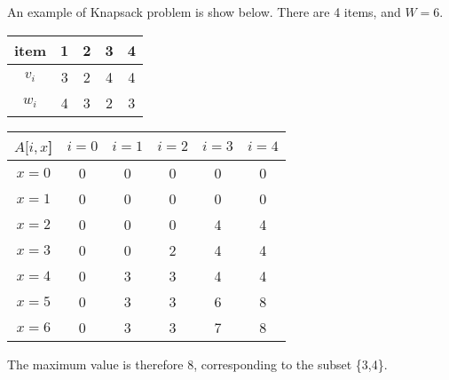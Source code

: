 An example of Knapsack problem is show below. There are 4 items, and $W = 6$. 
\begin{center}
\begin{tabular}{c|cccc}
item  & 1 & 2 & 3 & 4\\\hline
$v_i$ & 3 & 2 & 4 & 4\\
$w_i$ & 4 & 3 & 2 & 3\\
\end{tabular}
\begin{tabular}{c|ccccc}
$A[i,x$]& $i=0$ & $i=1$ & $i=2$ & $i=3$ & $i=4$\\\hline
$x=0$   &	0   & 0     & 0     & 0     & 0\\
$x=1$   &	0   & 0     & 0     & 0     & 0\\
$x=2$   &	0   & 0     & 0     & 4     & 4\\
$x=3$   &	0   & 0     & 2     & 4     & 4\\
$x=4$   &	0   & 3     & 3     & 4     & 4\\
$x=5$   &	0   & 3     & 3     & 6     & 8\\
$x=6$   &	0   & 3     & 3     & 7     & 8\\
\end{tabular}
\end{center}

The maximum value is therefore 8, corresponding to the subset \{3,4\}.
